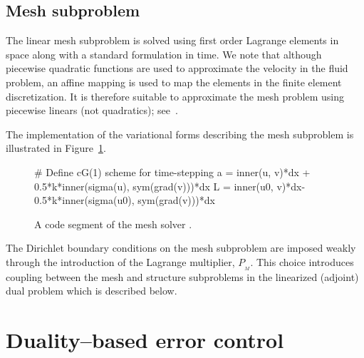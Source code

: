 \subsection{Mesh subproblem}

The linear mesh subproblem is solved using first order Lagrange
elements in space along with a standard \cgone{} formulation in time. We
note that although piecewise quadratic functions are used to
approximate the velocity in the fluid problem, an affine mapping is
used to map the elements in the finite element discretization. It is
therefore suitable to approximate the mesh problem using piecewise
linears (not quadratics); see~\citet{FormaggiaNobile1999}.

The implementation of the variational forms describing the mesh
subproblem is illustrated in Figure~\ref{selim:fig:meshsolver}.
\begin{figure}
\bwfig
\begin{python}
# Define cG(1) scheme for time-stepping
a = inner(u, v)*dx + 0.5*k*inner(sigma(u), sym(grad(v)))*dx
L = inner(u0, v)*dx-0.5*k*inner(sigma(u0), sym(grad(v)))*dx
\end{python}
\caption{A code segment of the mesh solver .}
\label{selim:fig:meshsolver}
\end{figure}
The Dirichlet boundary conditions on the mesh subproblem are imposed
weakly through the introduction of the Lagrange multiplier,
$P_{_{M}}$. This choice introduces coupling between the mesh and
structure subproblems in the linearized (adjoint) dual problem which
is described below.

\section{Duality--based error control}

